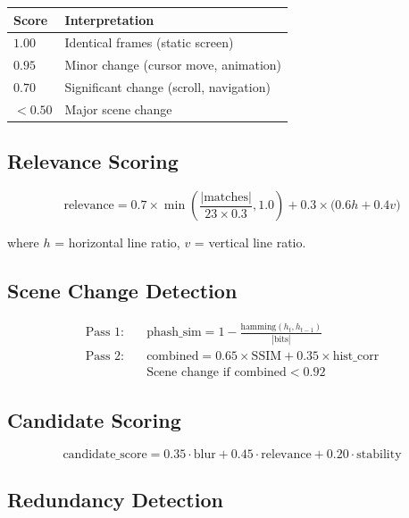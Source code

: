 \documentclass[12pt, a4paper]{article}
\begin{document}
\begin{tabularx}{\textwidth}{@{} l X @{}}
    \toprule
    \textbf{Score} & \textbf{Interpretation} \\
    \midrule
    $1.00$ & Identical frames (static screen) \\
    $0.95$ & Minor change (cursor move, animation) \\
    $0.70$ & Significant change (scroll, navigation) \\
    $< 0.50$ & Major scene change \\
    \bottomrule
\end{tabularx}

\subsection{Relevance Scoring}

\begin{equation}
    \text{relevance} = 0.7 \times \min\!\left(\frac{|\text{matches}|}{23 \times 0.3}, 1.0\right) + 0.3 \times \bigl(0.6h + 0.4v\bigr)
\end{equation}

where $h$ = horizontal line ratio, $v$ = vertical line ratio.

\subsection{Scene Change Detection}

\begin{align}
    \text{Pass 1:}\quad & \text{phash\_sim} = 1 - \frac{\text{hamming}(h_t, h_{t-1})}{|\text{bits}|} \\[6pt]
    \text{Pass 2:}\quad & \text{combined} = 0.65 \times \text{SSIM} + 0.35 \times \text{hist\_corr} \\[6pt]
    & \text{Scene change if } \text{combined} < 0.92
\end{align}

\subsection{Candidate Scoring}

\begin{equation}
    \text{candidate\_score} = 0.35 \cdot \text{blur} + 0.45 \cdot \text{relevance} + 0.20 \cdot \text{stability}
\end{equation}

\subsection{Redundancy Detection}
\end{document}
